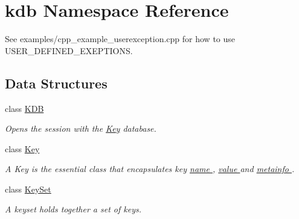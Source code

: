 \hypertarget{namespacekdb}{\section{kdb Namespace Reference}
\label{namespacekdb}
}


See examples/cpp\-\_\-example\-\_\-userexception.\-cpp for how to use U\-S\-E\-R\-\_\-\-D\-E\-F\-I\-N\-E\-D\-\_\-\-E\-X\-E\-P\-T\-I\-O\-N\-S.  


\subsection*{Data Structures}
\begin{DoxyCompactItemize}
\item 
class \hyperlink{classkdb_1_1KDB}{K\-D\-B}
\begin{DoxyCompactList}\small\item\em Opens the session with the \hyperlink{classkdb_1_1Key}{Key} database.   \end{DoxyCompactList}\item 
class \hyperlink{classkdb_1_1Key}{Key}
\begin{DoxyCompactList}\small\item\em A Key is the essential class that encapsulates key \hyperlink{group__keyname}{name }, \hyperlink{group__keyvalue}{value } and \hyperlink{group__keymeta}{metainfo }.  \end{DoxyCompactList}\item 
class \hyperlink{classkdb_1_1KeySet}{Key\-Set}
\begin{DoxyCompactList}\small\item\em A keyset holds together a set of keys. \end{DoxyCompactList}\end{DoxyCompactItemize}
